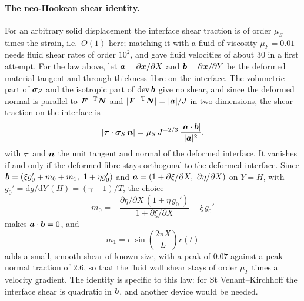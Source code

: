 \paragraph{The neo-Hookean shear identity.}
For an arbitrary solid displacement the interface shear traction is of order $\mu_S$ times the strain, i.e.\ $O(1)$ here; matching it with a fluid of viscosity $\mu_F = 0.01$ needs fluid shear rates of order $10^2$, and gave fluid velocities of about 30 in a first attempt.
For the law above, let $\boldsymbol{a} = \partial\boldsymbol{x}/\partial X$ and $\boldsymbol{b} = \partial\boldsymbol{x}/\partial Y$ be the deformed material tangent and through-thickness fibre on the interface.
The volumetric part of $\boldsymbol{\sigma}_S$ and the isotropic part of $\mathrm{dev}\,\bar{\boldsymbol{b}}$ give no shear, and since the deformed normal is parallel to $\boldsymbol{F}^{-\mathrm{T}}\boldsymbol{N}$ and $|\boldsymbol{F}^{-\mathrm{T}}\boldsymbol{N}| = |\boldsymbol{a}|/J$ in two dimensions, the shear traction on the interface is
\begin{equation}
	\left|\boldsymbol{\tau}\cdot\boldsymbol{\sigma}_S\,\boldsymbol{n}\right| = \mu_S\,J^{-2/3}\,\frac{|\boldsymbol{a}\cdot\boldsymbol{b}|}{|\boldsymbol{a}|^2},
\end{equation}
with $\boldsymbol{\tau}$ and $\boldsymbol{n}$ the unit tangent and normal of the deformed interface.
It vanishes if and only if the deformed fibre stays orthogonal to the deformed interface.
Since $\boldsymbol{b} = (\xi g_0' + m_0 + m_1,\ 1 + \eta g_0')$ and $\boldsymbol{a} = (1 + \partial\xi/\partial X,\ \partial\eta/\partial X)$ on $Y = H$, with $g_0' = \mathrm{d}g/\mathrm{d}Y\,(H) = (\gamma-1)/T$, the choice
\begin{equation}
	m_0 = -\frac{\partial\eta/\partial X\,(1 + \eta\,g_0')}{1 + \partial\xi/\partial X} - \xi\,g_0'
\end{equation}
makes $\boldsymbol{a}\cdot\boldsymbol{b} = 0$, and
\begin{equation}
	m_1 = e\,\sin\!\left(\frac{2\pi X}{L}\right) r(t)
\end{equation}
adds a small, smooth shear of known size, with a peak of $0.07$ against a peak normal traction of $2.6$, so that the fluid wall shear stays of order $\mu_F$ times a velocity gradient.
The identity is specific to this law: for St Venant--Kirchhoff the interface shear is quadratic in $\boldsymbol{b}$, and another device would be needed.

